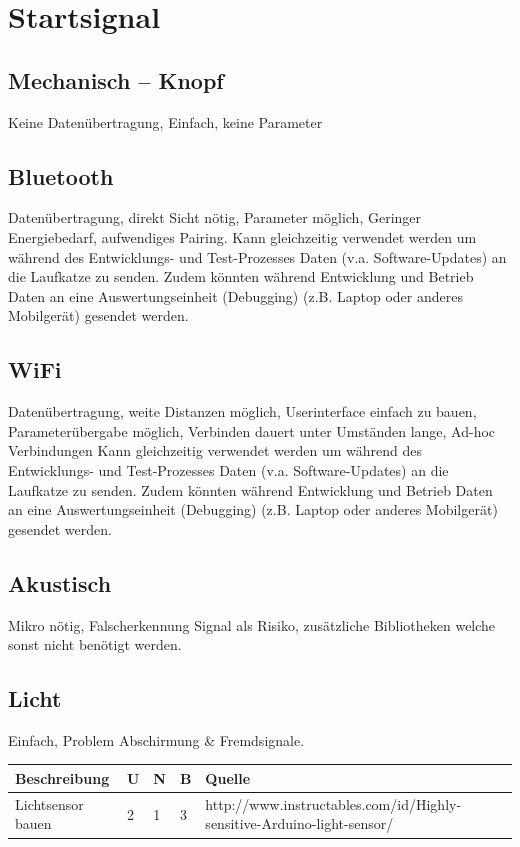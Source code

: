 \documentclass[a4paper]{report}
\begin{document}
\section{Startsignal}
\subsection{Mechanisch – Knopf}
Keine Datenübertragung, Einfach, keine Parameter

\subsection{Bluetooth}
Datenübertragung, direkt Sicht nötig, Parameter möglich, Geringer Energiebedarf, aufwendiges Pairing.
Kann gleichzeitig verwendet werden um während des Entwicklungs- und Test-Prozesses Daten (v.a. Software-Updates) an die Laufkatze zu senden. Zudem könnten während Entwicklung und Betrieb Daten an eine Auswertungseinheit (Debugging) (z.B. Laptop oder anderes Mobilgerät) gesendet werden.

\subsection{WiFi}
Datenübertragung, weite Distanzen möglich, Userinterface einfach zu bauen, Parameterübergabe möglich, Verbinden dauert unter Umständen lange, Ad-hoc Verbindungen
Kann gleichzeitig verwendet werden um während des Entwicklungs- und Test-Prozesses Daten (v.a. Software-Updates) an die Laufkatze zu senden. Zudem könnten während Entwicklung und Betrieb Daten an eine Auswertungseinheit (Debugging) (z.B. Laptop oder anderes Mobilgerät) gesendet werden.

\subsection{Akustisch}
Mikro nötig, Falscherkennung Signal als Risiko, zusätzliche Bibliotheken welche sonst nicht benötigt werden.

\subsection{Licht}
Einfach, Problem Abschirmung \& Fremdsignale.

\vspace{1em}
\noindent
\begin{tabular}{|p{}|p{}|p{}|p{}|p{}|}
	\hline
	\textbf{Beschreibung} & \textbf{U} & \textbf{N} & \textbf{B} & \textbf{Quelle} \\
	\hline
	Lichtsensor bauen & 2 & 1 & 3 & http://www.instructables.com/id/Highly-sensitive-Arduino-light-sensor/ \\
	\hline
\end{tabular}
\end{document}
